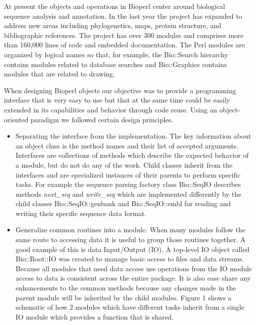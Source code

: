 \documentclass[12pt]{article}
\begin{document}
At present the objects and operations in Bioperl center around
biological sequence analysis and annotation.  In the last year the
project has expanded to address new areas including phylogenetics,
maps, protein structure, and bibliographic references.  The project
has over 300 modules and comprises more than 160,000 lines of code and
embedded documentation.  The Perl modules are organized by logical
names so that, for example, the Bio::Search hierarchy contains modules
related to database searches and Bio::Graphics contains modules that
are related to drawing.

When designing Bioperl objects our objective was to provide a
programming interface that is very easy to use but that at the same
time could be easily extended in its capabilities and behavior through
code reuse.  Using an object-oriented paradigm we followed certain
design principles.

\begin{itemize}

\item Separating the interface from the implementation.  The key
information about an object class is the method names and their list
of accepted arguments.  Interfaces are collections of methods which
describe the expected behavior of a module, but do not do any of the
work.  Child classes inherit from the interfaces and are specialized
instances of their parents to perform specific tasks.  For example the
sequence parsing factory class Bio::SeqIO describes methods
\textit{next\_seq} and \textit{write\_seq} which are implemented 
differently by the child classes Bio::SeqIO::genbank and
Bio::SeqIO::embl for reading and writing their specific sequence data format.

\item Generalize common routines into a module.  When many modules
follow the same route to accessing data it is useful to group those
routines together.  A good example of this is data Input/Output (IO).
A top-level IO object called Bio::Root::IO was created to manage basic
access to files and data streams.  Because all modules that need data
access use operations from the IO module access to data is consistent
across the entire package. It is also ease share any enhancements to
the common methods because any changes made in the parent module will
be inherited by the child modules.  Figure 1 shows a schematic of how
2 modules which have different tasks inherit from a single IO module
which provides a function that is shared.

\end{itemize}
\end{document}
